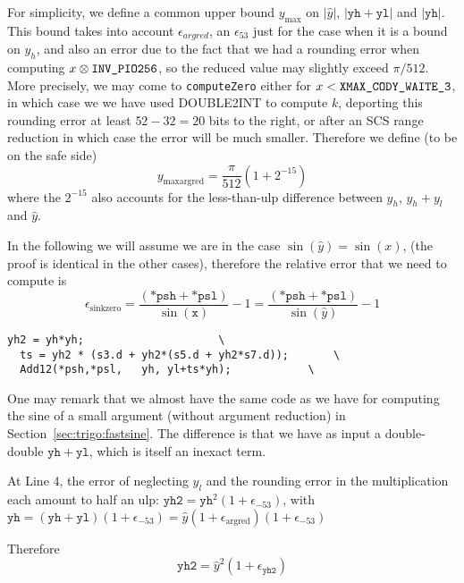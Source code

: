 For simplicity, we define a common upper bound $y_{\max}$ on
$|\hat{y}|$, $|\mathtt{yh}+\mathtt{yl}|$ and $|\mathtt{yh}|$. This
bound takes into account $\epsilon_{argred}$, an $\epsilon_{53}$ just
for the case when it is a bound on $y_h$, and also an error due to the
fact that we had a rounding error when computing
$x\otimes\verb!INV_PIO256!$, so the reduced value may slightly
exceed $\pi/512$. More precisely, we may come to \texttt{computeZero}
either for $x<\verb!XMAX_CODY_WAITE_3!$, in which case we we have used
DOUBLE2INT to compute $k$, deporting this rounding error at least $52-32=20$
bits to the right, or after an SCS range reduction in which case the
error will be much smaller. Therefore we define (to be on the safe side)
\begin{equation}
  y_{\mathrm{maxargred}} = \frac{\pi}{512}(1+2^{-15})
  \label{eq:ymaxsink0}  
\end{equation}
where the $2^{-15}$ also accounts for the less-than-ulp difference
between $y_h$, $y_h+y_l$ and $\widehat{y}$.

In the following we will
assume we are in the case $\sin(\hat{y}) = \sin(x)$, (the proof is
identical in the other cases), therefore the relative error that we need
to compute is
\begin{equation}
  \epsilon_{\mathrm{sinkzero}} = \frac{(\mathtt{*psh} + \mathtt{*psl})}{\sin(\mathtt{x})} -1 = \frac{(\mathtt{*psh} + \mathtt{*psl})}{\sin(\hat{y})} -1
\end{equation}


 \begin{lstlisting}[caption={DoSinZero},firstnumber=1]
  yh2 = yh*yh;					   \
  ts = yh2 * (s3.d + yh2*(s5.d + yh2*s7.d));	   \
  Add12(*psh,*psl,   yh, yl+ts*yh);	           \
\end{lstlisting}

One may remark that we almost have the same code as we have for
computing the sine of a small argument (without argument reduction) in
Section~\ref{sec:trigo:fastsine}. The difference is that we have as
input a double-double $\mathtt{yh}+\mathtt{yl}$, which is itself an
inexact term.

At Line 4, the error of neglecting $y_l$ and the rounding error in the
multiplication each amount to half an ulp:
  $\mathtt{yh2}=\mathtt{yh}^2(1+\epsilon_{-53})$, 
 with $\mathtt{yh} = (\mathtt{yh}+\mathtt{yl})(1+\epsilon_{-53}) = \hat{y}(1+\epsilon_{\mathrm{argred}})(1+\epsilon_{-53})$

Therefore
\begin{equation}
  \mathtt{yh2}=\hat{y}^2(1+\epsilon_{\mathtt{yh2}})
\end{equation}

